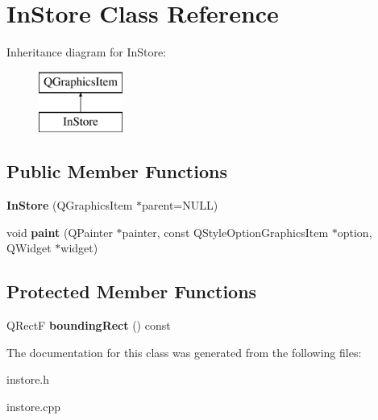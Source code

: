 \hypertarget{class_in_store}{\section{In\-Store Class Reference}
\label{class_in_store}
}
Inheritance diagram for In\-Store\-:\begin{figure}[H]
\begin{center}
\leavevmode
\includegraphics[height=2.000000cm]{class_in_store}
\end{center}
\end{figure}
\subsection*{Public Member Functions}
\begin{DoxyCompactItemize}
\item 
\hypertarget{class_in_store_ada28f501479c707689eeb14d5258c11b}{{\bfseries In\-Store} (Q\-Graphics\-Item $\ast$parent=N\-U\-L\-L)}\label{class_in_store_ada28f501479c707689eeb14d5258c11b}

\item 
\hypertarget{class_in_store_a7778b31865d65ce049dda2bf73569962}{void {\bfseries paint} (Q\-Painter $\ast$painter, const Q\-Style\-Option\-Graphics\-Item $\ast$option, Q\-Widget $\ast$widget)}\label{class_in_store_a7778b31865d65ce049dda2bf73569962}

\end{DoxyCompactItemize}
\subsection*{Protected Member Functions}
\begin{DoxyCompactItemize}
\item 
\hypertarget{class_in_store_a00c8b6bd40d5d7580e52418b5e58d9ef}{Q\-Rect\-F {\bfseries bounding\-Rect} () const }\label{class_in_store_a00c8b6bd40d5d7580e52418b5e58d9ef}

\end{DoxyCompactItemize}


The documentation for this class was generated from the following files\-:\begin{DoxyCompactItemize}
\item 
instore.\-h\item 
instore.\-cpp\end{DoxyCompactItemize}
